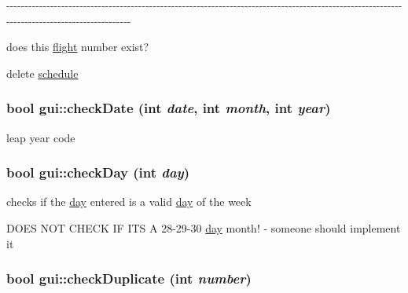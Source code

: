 -\/-\/-\/-\/-\/-\/-\/-\/-\/-\/-\/-\/-\/-\/-\/-\/-\/-\/-\/-\/-\/-\/-\/-\/-\/-\/-\/-\/-\/-\/-\/-\/-\/-\/-\/-\/-\/-\/-\/-\/-\/-\/-\/-\/-\/-\/-\/-\/-\/-\/-\/-\/-\/-\/-\/-\/-\/-\/-\/-\/-\/-\/-\/-\/-\/-\/-\/-\/-\/-\/-\/-\/-\/-\/-\/-\/-\/-\/-\/-\/-\/-\/-\/-\/-\/-\/-\/-\/-\/-\/-\/-\/-\/-\/-\/-\/-\/-\/-\/-\/-\/-\/-\/-\/-\/-\/-\/-\/-\/-\/-\/-\/-\/-\/-\/-\/-\/-\/-\/-\/-\/-\/-\/-\/-\/-\/-\/-\/-\/-\/-\/-\/-\/-\/-\/-\/-\/-\/-\/-\/-\/-\/ 

does this \hyperlink{classflight}{flight} number exist?

delete \hyperlink{classschedule}{schedule} \hypertarget{classgui_a29e87d6cb929726a430bdd4ce93163d9}{
\subsubsection[{checkDate}]{\setlength{\rightskip}{0pt plus 5cm}bool gui::checkDate (int {\em date}, \/  int {\em month}, \/  int {\em year})}}
\label{classgui_a29e87d6cb929726a430bdd4ce93163d9}


leap year code \hypertarget{classgui_ad07e2e40af400425176862a1d82f59c8}{
\subsubsection[{checkDay}]{\setlength{\rightskip}{0pt plus 5cm}bool gui::checkDay (int {\em day})}}
\label{classgui_ad07e2e40af400425176862a1d82f59c8}


checks if the \hyperlink{classday}{day} entered is a valid \hyperlink{classday}{day} of the week

DOES NOT CHECK IF ITS A 28-\/29-\/30 \hyperlink{classday}{day} month! -\/ someone should implement it \hypertarget{classgui_a56286e7605a615ea09443ea66f3eca58}{
\subsubsection[{checkDuplicate}]{\setlength{\rightskip}{0pt plus 5cm}bool gui::checkDuplicate (int {\em number})}}
\label{classgui_a56286e7605a615ea09443ea66f3eca58}


